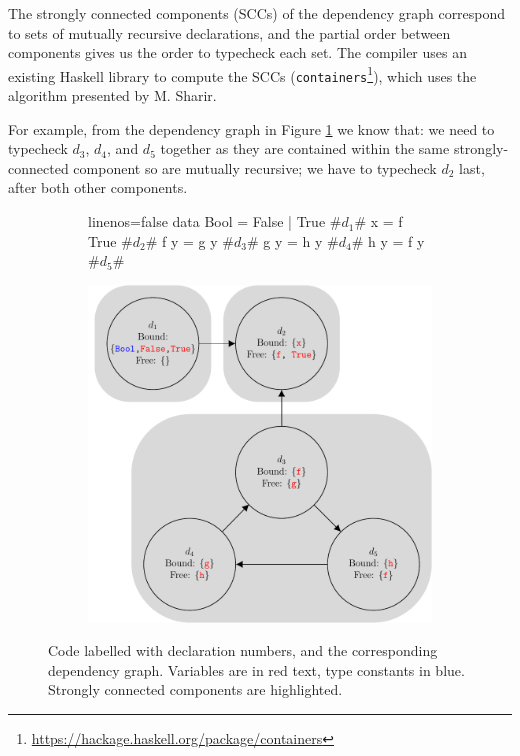 \documentclass[dissertation.tex]{subfiles}
\begin{document}
{{        The strongly connected components (SCCs) of the dependency graph correspond to sets of mutually recursive declarations, and the partial order between components gives us the order to typecheck each set. The compiler uses an existing Haskell library to compute the SCCs (\texttt{containers}\footnote{\url{https://hackage.haskell.org/package/containers}}), which uses the algorithm presented by M. Sharir\cite{SCC}.

        For example, from the dependency graph in Figure \ref{fig:dependency-graph} we know that: we need to typecheck \(d_3\), \(d_4\), and \(d_5\) together as they are contained within the same strongly-connected component so are mutually recursive; we have to typecheck \(d_2\) last, after both other components.

        \begin{figure}[h]
        \centering
        \begin{subfigure}[t]{0.4\textwidth}
            \begin{haskellfigure*}{linenos=false}
            data Bool = False | True      #\(d_1\)#
            x = f True                    #\(d_2\)#
            f y = g y                     #\(d_3\)#
            g y = h y                     #\(d_4\)#
            h y = f y                     #\(d_5\)#
            \end{haskellfigure*}
        \end{subfigure}
        \begin{subfigure}[t]{0.5\textwidth}
            \includegraphics[width=\textwidth, valign=t]{figures/dependency_graph.pdf}
        \end{subfigure}
        \caption
        {
            Code labelled with declaration numbers, and the corresponding dependency graph. Variables are in red text, type constants in blue. Strongly connected components are highlighted.
        }
        \label{fig:dependency-graph}
        \end{figure}

}}
\end{document}
